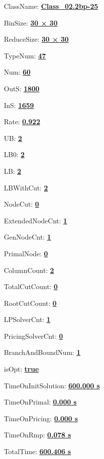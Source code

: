 \documentclass[11pt]{article}
\begin{document}
\pagestyle{empty}


ClassName: \underline{\textbf{Class_02.2bp-25}}
\par
BinSize: \underline{\textbf{30 × 30}}
\par
ReduceSize: \underline{\textbf{30 × 30}}
\par
TypeNum: \underline{\textbf{47}}
\par
Num: \underline{\textbf{60}}
\par
OutS: \underline{\textbf{1800}}
\par
InS: \underline{\textbf{1659}}
\par
Rate: \underline{\textbf{0.922}}
\par
UB: \underline{\textbf{2}}
\par
LB0: \underline{\textbf{2}}
\par
LB: \underline{\textbf{2}}
\par
LBWithCut: \underline{\textbf{2}}
\par
NodeCut: \underline{\textbf{0}}
\par
ExtendedNodeCnt: \underline{\textbf{1}}
\par
GenNodeCnt: \underline{\textbf{1}}
\par
PrimalNode: \underline{\textbf{0}}
\par
ColumnCount: \underline{\textbf{2}}
\par
TotalCutCount: \underline{\textbf{0}}
\par
RootCutCount: \underline{\textbf{0}}
\par
LPSolverCnt: \underline{\textbf{1}}
\par
PricingSolverCnt: \underline{\textbf{0}}
\par
BranchAndBoundNum: \underline{\textbf{1}}
\par
isOpt: \underline{\textbf{true}}
\par
TimeOnInitSolution: \underline{\textbf{600.000 s}}
\par
TimeOnPrimal: \underline{\textbf{0.000 s}}
\par
TimeOnPricing: \underline{\textbf{0.000 s}}
\par
TimeOnRmp: \underline{\textbf{0.078 s}}
\par
TotalTime: \underline{\textbf{600.406 s}}
\par
\newpage
\end{document}
